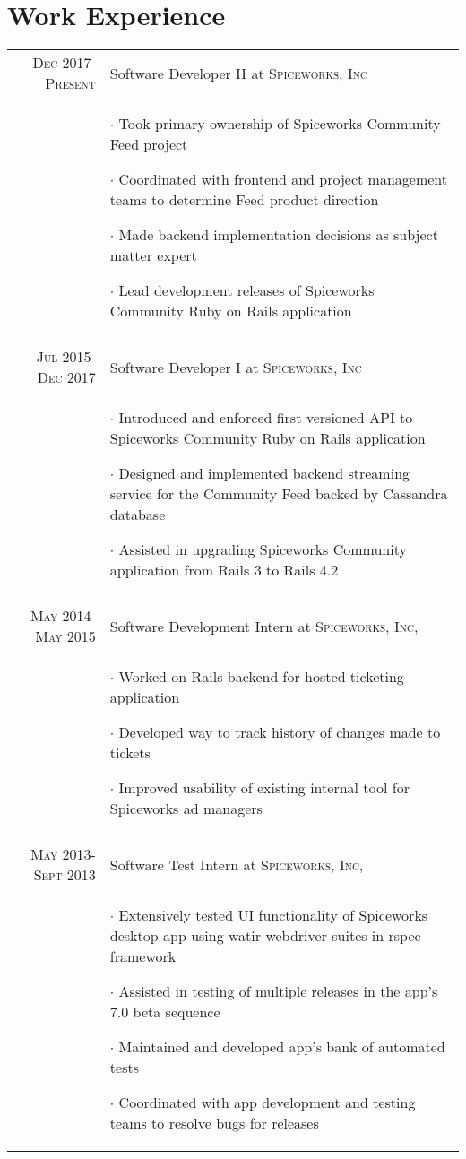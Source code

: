 \documentclass[a4paper,10pt]{article}
\begin{document}
\section{Work Experience}
\begin{tabular}{r|p{11cm}}
 \textsc{Dec 2017-Present} & Software Developer II at \textsc{Spiceworks, Inc} \\&\footnotesize{
   $\cdot$ Took primary ownership of Spiceworks Community Feed project

   $\cdot$ Coordinated with frontend and project management teams to determine Feed product direction

   $\cdot$ Made backend implementation decisions as subject matter expert

   $\cdot$ Lead development releases of Spiceworks Community Ruby on Rails application
 }\\\multicolumn{2}{c}{} \\
 \textsc{Jul 2015-Dec 2017} & Software Developer I at \textsc{Spiceworks, Inc} \\&\footnotesize{
 $\cdot$ Introduced and enforced first versioned API to Spiceworks Community Ruby on Rails application

 $\cdot$ Designed and implemented backend streaming service for the Community Feed backed by Cassandra database

 $\cdot$ Assisted in upgrading Spiceworks Community application from Rails 3 to Rails 4.2
 }\\\multicolumn{2}{c}{} \\
\textsc{May 2014-May 2015} & Software Development Intern at \textsc{Spiceworks, Inc}, \\&\footnotesize{
 $\cdot$ Worked on Rails backend for hosted ticketing application

 $\cdot$ Developed way to track history of changes made to tickets

 $\cdot$ Improved usability of existing internal tool for Spiceworks ad managers
}\\\multicolumn{2}{c}{} \\
\textsc{May 2013-Sept 2013} & Software Test Intern at \textsc{Spiceworks, Inc}, \\&\footnotesize{
 $\cdot$ Extensively tested UI functionality of Spiceworks desktop app using watir-webdriver suites in rspec framework

 $\cdot$ Assisted in testing of multiple releases in the app's 7.0 beta sequence

 $\cdot$ Maintained and developed app's bank of automated tests

 $\cdot$ Coordinated with app development and testing teams to resolve bugs for releases
}
\end{tabular}
\end{document}
